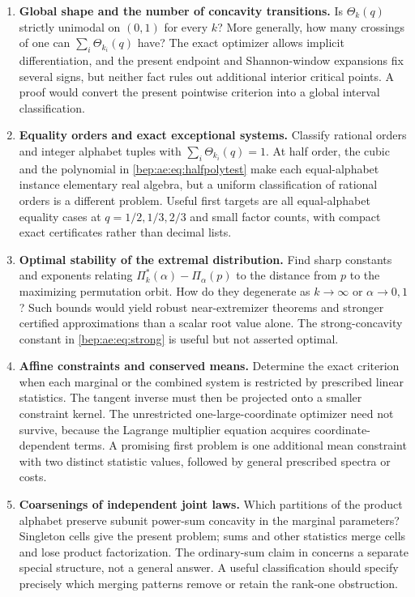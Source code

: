 \documentclass[11pt]{article}
\numberwithin{equation}{section}
\theoremstyle{definition}
\theoremstyle{remark}
\begin{document}
\begin{enumerate}[label=\textbf{AQ\arabic*.},leftmargin=3.6em]
\item \textbf{Global shape and the number of concavity transitions.}
Is $\Theta_k(q)$ strictly unimodal on $(0,1)$ for every $k$? More
generally, how many crossings of one can
$\sum_i\Theta_{k_i}(q)$ have? The exact optimizer allows implicit
differentiation, and the present endpoint and Shannon-window expansions
fix several signs, but neither fact rules out additional interior
critical points. A proof would convert the present pointwise criterion
into a global interval classification.

\item \textbf{Equality orders and exact exceptional systems.}
Classify rational orders and integer alphabet tuples with
$\sum_i\Theta_{k_i}(q)=1$. At half order, the cubic and the polynomial
in \eqref{bep:ae:eq:halfpolytest} make each equal-alphabet instance elementary
real algebra, but a uniform classification of rational orders is a
different problem. Useful first targets are all equal-alphabet equality
cases at $q=1/2,1/3,2/3$ and small factor counts, with compact exact
certificates rather than decimal lists.

\item \textbf{Optimal stability of the extremal distribution.}
Find sharp constants and exponents relating
$\Pi^{*}_k(\alpha)-\Pi_\alpha(p)$ to the distance from $p$ to the maximizing
permutation orbit. How do they degenerate as $k\to\infty$ or
$\alpha\to0,1$? Such bounds would yield robust near-extremizer theorems
and stronger certified approximations than a scalar root value alone.
The strong-concavity constant in \eqref{bep:ae:eq:strong} is useful but not
asserted optimal.

\item \textbf{Affine constraints and conserved means.}
Determine the exact criterion when each marginal or the combined system
is restricted by prescribed linear statistics. The tangent inverse must
then be projected onto a smaller constraint kernel. The unrestricted
one-large-coordinate optimizer need not survive, because the Lagrange
multiplier equation acquires coordinate-dependent terms. A promising
first problem is one additional mean constraint with two distinct
statistic values, followed by general prescribed spectra or costs.

\item \textbf{Coarsenings of independent joint laws.}
Which partitions of the product alphabet preserve subunit power-sum
concavity in the marginal parameters? Singleton cells give the present
problem; sums and other statistics merge cells and lose product
factorization. The ordinary-sum claim in \cite{bep:pe:Wang} concerns a separate
special structure, not a general answer. A useful classification should
specify precisely which merging patterns remove or retain the
rank-one obstruction.


\end{enumerate}
\end{document}
